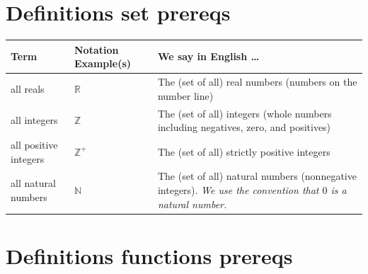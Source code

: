 \documentclass[12pt, oneside]{article}
\begin{document}
\vfill \vfill
\section*{Definitions set prereqs}


\begin{center}
\begin{tabular}{|llp{9.8cm}|}
\hline
{\bf Term} & {\bf Notation Example(s)} & {\bf We say in English \ldots } \\
\hline
all reals & $\mathbb{R}$ & The (set of all) real numbers (numbers on the number line)\\
all integers & $\mathbb{Z}$ & The (set of all) integers (whole numbers including negatives, zero, and positives) \\
all positive integers & $\mathbb{Z}^+$ & The (set of all) strictly positive integers \\
all natural numbers & $\mathbb{N}$ & The (set of all) natural numbers (nonnegative integers). {\it We use the convention that $0$ is a natural number.} \\


\hline
\end{tabular}
\end{center} \vfill
\section*{Definitions functions prereqs}
\end{document}
